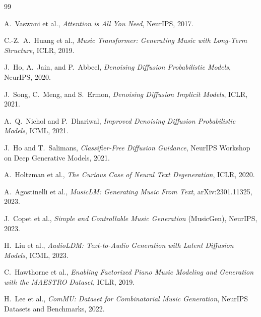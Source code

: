 \documentclass[oneside, a4paper, 12pt]{book}
\renewcommand{\thesection}{\arabic{chapter}.\arabic{section}}
\theoremstyle{plain}
\theoremstyle{definition}
\theoremstyle{remark}
\begin{document}
\setcounter{section}{0}
\renewcommand*{\thesection}{\the\value{section}}
\begin{thebibliography}{99}\rm
{}

A.~Vaswani et al., \textit{Attention is All You Need}, NeurIPS, 2017.

C.-Z.~A.~Huang et al., \textit{Music Transformer: Generating Music with Long-Term Structure}, ICLR, 2019.

J.~Ho, A.~Jain, and P.~Abbeel, \textit{Denoising Diffusion Probabilistic Models}, NeurIPS, 2020.

J.~Song, C.~Meng, and S.~Ermon, \textit{Denoising Diffusion Implicit Models}, ICLR, 2021.

A.~Q.~Nichol and P.~Dhariwal, \textit{Improved Denoising Diffusion Probabilistic Models}, ICML, 2021.

J.~Ho and T.~Salimans, \textit{Classifier-Free Diffusion Guidance}, NeurIPS Workshop on Deep Generative Models, 2021.

A.~Holtzman et al., \textit{The Curious Case of Neural Text Degeneration}, ICLR, 2020.

A.~Agostinelli et al., \textit{MusicLM: Generating Music From Text}, arXiv:2301.11325, 2023.

J.~Copet et al., \textit{Simple and Controllable Music Generation} (MusicGen), NeurIPS, 2023.

H.~Liu et al., \textit{AudioLDM: Text-to-Audio Generation with Latent Diffusion Models}, ICML, 2023.

C.~Hawthorne et al., \textit{Enabling Factorized Piano Music Modeling and Generation with the MAESTRO Dataset}, ICLR, 2019.

H.~Lee et al., \textit{ComMU: Dataset for Combinatorial Music Generation}, NeurIPS Datasets and Benchmarks, 2022.

\end{thebibliography}
\end{document}
